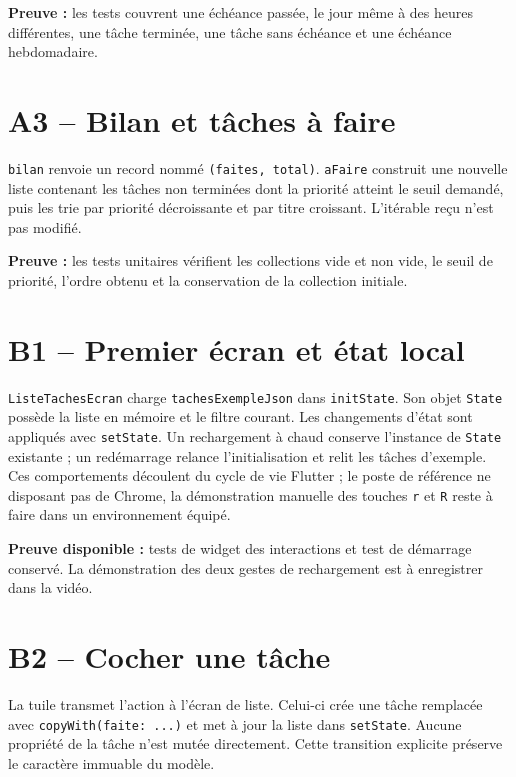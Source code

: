 \documentclass[12pt,a4paper]{report}
\begin{document}
\textbf{Preuve :} les tests couvrent une échéance passée, le jour même à des heures différentes, une tâche terminée, une tâche sans échéance et une échéance hebdomadaire.

\section{A3 -- Bilan et tâches à faire}

\texttt{bilan} renvoie un record nommé \texttt{(faites, total)}. \texttt{aFaire} construit une nouvelle liste contenant les tâches non terminées dont la priorité atteint le seuil demandé, puis les trie par priorité décroissante et par titre croissant. L’itérable reçu n’est pas modifié.

\textbf{Preuve :} les tests unitaires vérifient les collections vide et non vide, le seuil de priorité, l’ordre obtenu et la conservation de la collection initiale.

\section{B1 -- Premier écran et état local}

\texttt{ListeTachesEcran} charge \texttt{tachesExempleJson} dans \texttt{initState}. Son objet \texttt{State} possède la liste en mémoire et le filtre courant. Les changements d’état sont appliqués avec \texttt{setState}. Un rechargement à chaud conserve l’instance de \texttt{State} existante ; un redémarrage relance l’initialisation et relit les tâches d’exemple. Ces comportements découlent du cycle de vie Flutter ; le poste de référence ne disposant pas de Chrome, la démonstration manuelle des touches \texttt{r} et \texttt{R} reste à faire dans un environnement équipé.

\textbf{Preuve disponible :} tests de widget des interactions et test de démarrage conservé. La démonstration des deux gestes de rechargement est à enregistrer dans la vidéo.

\section{B2 -- Cocher une tâche}

La tuile transmet l’action à l’écran de liste. Celui-ci crée une tâche remplacée avec \texttt{copyWith(faite: ...)} et met à jour la liste dans \texttt{setState}. Aucune propriété de la tâche n’est mutée directement. Cette transition explicite préserve le caractère immuable du modèle.
\end{document}
